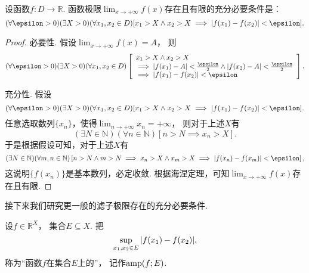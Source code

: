 \begin{theorem}\label{theorem:极限.函数的柯西极限存在准则}
设函数\(f\colon D\to\mathbb{R}\).
函数极限\(\lim_{x\to+\infty} f(x)\)存在且有限的充分必要条件是：\begin{equation*}
	(\forall\epsilon>0)
	(\exists X>0)
	(\forall x_1,x_2\in D)\\ \relax
	[
		x_1 > X \land x_2 > X
		\implies
		\abs{f(x_1) - f(x_2)} < \epsilon
	].
\end{equation*}
\begin{proof}
必要性.
假设\(\lim_{x\to+\infty} f(x) = A\)，
则\begin{equation*}
	(\forall\epsilon>0)
	(\exists X>0)
	(\forall x_1,x_2\in D)
	\left[
		\begin{array}{l}
			x_1 > X \land x_2 > X \\
			\implies
			\abs{f(x_1) - A} < \frac\epsilon2
			\land
			\abs{f(x_2) - A} < \frac\epsilon2 \\
			\implies
			\abs{f(x_1) - f(x_2)} < \epsilon
		\end{array}
	\right].
\end{equation*}

充分性.
假设\begin{equation*}
	(\forall\epsilon>0)
	(\exists X>0)
	(\forall x_1,x_2\in D)
	[
		x_1 > X \land x_2 > X
		\implies
		\abs{f(x_1) - f(x_2)} < \epsilon
	].
\end{equation*}
任意选取数列\(\{x_n\}\)，使得\(\lim_{n\to+\infty} x_n = +\infty\)，
则对于上述\(X\)有\begin{equation*}
	(\exists N\in\mathbb{N})
	(\forall n\in\mathbb{N})
	[
		n > N
		\implies
		x_n > X
	].
\end{equation*}
于是根据假设可知，对于上述\(X\)有\begin{equation*}
	(\exists N\in\mathbb{N})
	(\forall m,n\in\mathbb{N})
	\left[
		n > N \land m > N
		\implies
		x_n > X \land x_m > X
		\implies
		\abs{f(x_n) - f(x_m)} < \epsilon
	\right],
\end{equation*}
这说明\(\{f(x_n)\}\)是基本数列，必定收敛.
根据海涅定理，可知\(\lim_{x\to+\infty} f(x)\)存在且有限.
\end{proof}
\end{theorem}

接下来我们研究更一般的滤子极限存在的充分必要条件.

\begin{definition}\label{definition:极限.函数在集合上的振幅}
设\(f\in\mathbb{R}^X\)，
集合\(E \subseteq X\).
把\begin{equation*}
	\sup_{x_1,x_2 \in E}\abs{f(x_1)-f(x_2)},
\end{equation*}
称为“函数\(f\)在集合\(E\)上的”，
记作\(\operatorname{amp}(f;E)\).
\end{definition}

